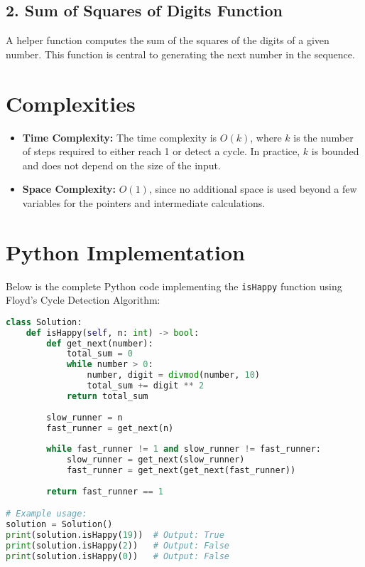\subsection*{2. Sum of Squares of Digits Function}

A helper function computes the sum of the squares of the digits of a given number. This function is central to generating the next number in the sequence.


\section*{Complexities}

\begin{itemize}
    \item \textbf{Time Complexity:} The time complexity is \(O(k)\), where \(k\) is the number of steps required to either reach 1 or detect a cycle. In practice, \(k\) is bounded and does not depend on the size of the input.
    
    \item \textbf{Space Complexity:} \(O(1)\), since no additional space is used beyond a few variables for the pointers and intermediate calculations.
\end{itemize}

\section*{Python Implementation}


Below is the complete Python code implementing the \texttt{isHappy} function using Floyd's Cycle Detection Algorithm:

\begin{fullwidth}
\begin{lstlisting}[language=Python]
class Solution:
    def isHappy(self, n: int) -> bool:
        def get_next(number):
            total_sum = 0
            while number > 0:
                number, digit = divmod(number, 10)
                total_sum += digit ** 2
            return total_sum
        
        slow_runner = n
        fast_runner = get_next(n)
        
        while fast_runner != 1 and slow_runner != fast_runner:
            slow_runner = get_next(slow_runner)
            fast_runner = get_next(get_next(fast_runner))
        
        return fast_runner == 1

# Example usage:
solution = Solution()
print(solution.isHappy(19))  # Output: True
print(solution.isHappy(2))   # Output: False
print(solution.isHappy(0))   # Output: False
\end{lstlisting}
\end{fullwidth}

